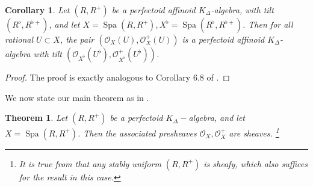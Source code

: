 \documentclass[12pts,a4paper]{amsart}
\newtheorem{corollary}[proposition]{Corollary}
\newtheorem{theorem}[proposition]{Theorem}
\DeclareMathOperator{\spa}{Spa}
\begin{document}
\begin{corollary}
    Let $(R,R^+)$ be a perfectoid affinoid $K_\Delta$-algebra, with tilt $(R^\flat,R^{\flat +})$, and let $X=\spa(R,R^+), X^\flat=\spa(R^\flat,R^{\flat +})$. Then for all rational $U\subset X$, the pair $(\mathcal{O}_X(U),\mathcal{O}^+_X(U))$ is a perfectoid affinoid $K_\Delta$-algebra with tilt $(\mathcal{O}_{X^\flat}(U^\flat),\mathcal{O}^+_{X^\flat}(U^\flat))$.
\end{corollary}

\begin{proof}
    The proof is exactly analogous to Corollary 6.8 of \cite{Sch}.
\end{proof}

 We now state our main theorem as in \cite{Sch}.

\begin{theorem}
    Let $(R,R^+)$ be a perfectoid $K_\Delta-$algebra, and let $X=\spa(R,R^+)$. Then the associated presheaves $\mathcal{O}_X,\mathcal{O}^+_X$ are sheaves. \footnote{It is true from \cite{Buzz} that any stably uniform $(R,R^+)$ is sheafy, which also suffices for the result in this case.} 
\end{theorem}
\end{document}
